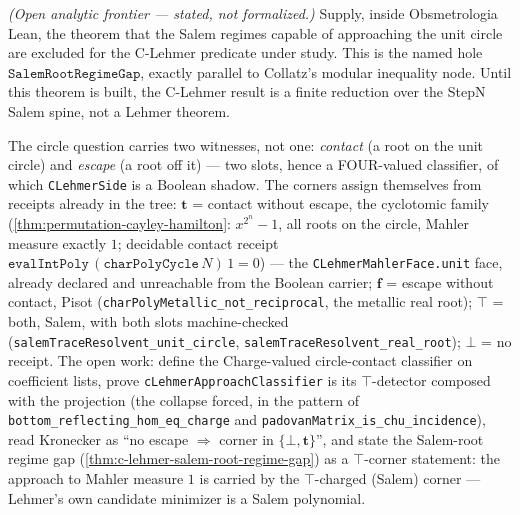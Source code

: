 \begin{theorem}\label{thm:c-lehmer-salem-analytic-gap}\notready{}
\emph{(Open analytic frontier --- stated, not formalized.)} Supply, inside
Obsmetrologia Lean, the theorem that the Salem regimes capable of approaching the
unit circle are excluded for the C-Lehmer predicate under study.  This is the
named hole \(\texttt{SalemRootRegimeGap}\), exactly parallel to Collatz's
modular inequality node.  Until this theorem is built, the C-Lehmer result is a
finite reduction over the StepN Salem spine, not a Lehmer theorem.
\end{theorem}

\begin{theorem}\label{thm:c-lehmer-cyclotomic-face}\notready{}
The circle question carries two witnesses, not one: \emph{contact}
(a root on the unit circle) and \emph{escape} (a root off it) --- two slots,
hence a FOUR-valued classifier, of which \texttt{CLehmerSide} is a Boolean
shadow. The corners assign themselves from receipts already in the tree:
$\mathbf{t}$ = contact without escape, the cyclotomic family
(\cref{thm:permutation-cayley-hamilton}: $x^{2^n}-1$, all roots on the
circle, Mahler measure exactly $1$; decidable contact receipt
$\texttt{evalIntPoly}\,(\texttt{charPolyCycle}\,N)\,1 = 0$) --- the
\texttt{CLehmerMahlerFace.unit} face, already declared and unreachable from
the Boolean carrier; $\mathbf{f}$ = escape without contact, Pisot
(\texttt{charPolyMetallic\_not\_reciprocal}, the metallic real root);
$\top$ = both, Salem, with both slots machine-checked
(\texttt{salemTraceResolvent\_unit\_circle},
\texttt{salemTraceResolvent\_real\_root}); $\bot$ = no receipt. The open
work: define the Charge-valued circle-contact classifier on coefficient
lists, prove \texttt{cLehmerApproachClassifier} is its $\top$-detector
composed with the projection (the collapse forced, in the pattern of
\texttt{bottom\_reflecting\_hom\_eq\_charge} and
\texttt{padovanMatrix\_is\_chu\_incidence}), read Kronecker as ``no escape
$\Rightarrow$ corner in $\{\bot, \mathbf t\}$'', and state the Salem-root
regime gap (\cref{thm:c-lehmer-salem-root-regime-gap}) as a $\top$-corner
statement: the approach to Mahler measure $1$ is carried by the
$\top$-charged (Salem) corner --- Lehmer's own candidate minimizer is a
Salem polynomial.
\end{theorem}

